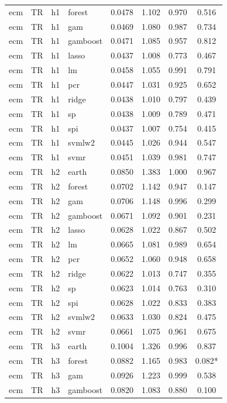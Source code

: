 \begin{ThreePartTable}
\begin{longtable}[t]{llclcccc}
ecm & TR & h1 & forest & 0.0478 & 1.102 & 0.970 & 0.516\\
ecm & TR & h1 & gam & 0.0469 & 1.080 & 0.987 & 0.734\\
ecm & TR & h1 & gamboost & 0.0471 & 1.085 & 0.957 & 0.812\\
ecm & TR & h1 & lasso & 0.0437 & 1.008 & 0.773 & 0.467\\
ecm & TR & h1 & lm & 0.0458 & 1.055 & 0.991 & 0.791\\
ecm & TR & h1 & pcr & 0.0447 & 1.031 & 0.925 & 0.652\\
ecm & TR & h1 & ridge & 0.0438 & 1.010 & 0.797 & 0.439\\
ecm & TR & h1 & sp & 0.0438 & 1.009 & 0.789 & 0.471\\
ecm & TR & h1 & spi & 0.0437 & 1.007 & 0.754 & 0.415\\
ecm & TR & h1 & svmlw2 & 0.0445 & 1.026 & 0.944 & 0.547\\
ecm & TR & h1 & svmr & 0.0451 & 1.039 & 0.981 & 0.747\\
\addlinespace
ecm & TR & h2 & earth & 0.0850 & 1.383 & 1.000 & 0.967\\
ecm & TR & h2 & forest & 0.0702 & 1.142 & 0.947 & 0.147\\
ecm & TR & h2 & gam & 0.0706 & 1.148 & 0.996 & 0.299\\
ecm & TR & h2 & gamboost & 0.0671 & 1.092 & 0.901 & 0.231\\
ecm & TR & h2 & lasso & 0.0628 & 1.022 & 0.867 & 0.502\\
ecm & TR & h2 & lm & 0.0665 & 1.081 & 0.989 & 0.654\\
ecm & TR & h2 & pcr & 0.0652 & 1.060 & 0.948 & 0.658\\
ecm & TR & h2 & ridge & 0.0622 & 1.013 & 0.747 & 0.355\\
ecm & TR & h2 & sp & 0.0623 & 1.014 & 0.763 & 0.310\\
ecm & TR & h2 & spi & 0.0628 & 1.022 & 0.833 & 0.383\\
ecm & TR & h2 & svmlw2 & 0.0633 & 1.030 & 0.824 & 0.475\\
ecm & TR & h2 & svmr & 0.0661 & 1.075 & 0.961 & 0.675\\
\addlinespace
ecm & TR & h3 & earth & 0.1004 & 1.326 & 0.996 & 0.837\\
ecm & TR & h3 & forest & 0.0882 & 1.165 & 0.983 & 0.082*\\
ecm & TR & h3 & gam & 0.0926 & 1.223 & 0.999 & 0.538\\
ecm & TR & h3 & gamboost & 0.0820 & 1.083 & 0.880 & 0.100\\

\end{longtable}
\end{ThreePartTable}
